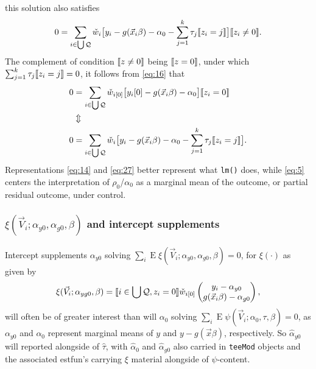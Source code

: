 \documentclass{article}
\newcommand{\EE}{\operatorname{E}}
\DeclarePairedDelimiter{\indicator}{\llbracket}{\rrbracket}
\newcommand{\owt}[1][{[z_{i}]}]{\ensuremath{\check{w}_{i#1}}}
\begin{document}
this solution also satisfies
\begin{equation*}
       0 = \sum_{i \in \bigcup \mathcal{Q}}\owt[]\big[y_{i} - g(\vec{x}_{i}\beta)-
                  \alpha_{0}-\sum_{j=1}^{k}\tau_{j}\indicator{z_{i}=j}\big]\indicator{z_{i}
                  \neq 0}.
\end{equation*}
The complement of condition $\indicator{z\neq 0}$ being
$\indicator{z=0}$, under which
$\sum_{j=1}^{k}\tau_{j}\indicator{z_{i}=j}=0$, it follows from \eqref{eq:16} that
\begin{align*}
         0 &= \sum_{i \in \bigcup \mathcal{Q}}\owt[{[0]}]\big[y_{i}[0] - g(\vec{x}_{i}\beta)-
                  \alpha_{0}\big]\indicator{z_{i}
             =0}\\
           & \Updownarrow \\
         0 &= \sum_{i \in \bigcup \mathcal{Q}}\owt[]\big[y_{i} - g(\vec{x}_{i}\beta)-
                  \alpha_{0} - \sum_{j=1}^{k}\tau_{j}\indicator{z_{i}=j}\big].
\end{align*}
Representations \eqref{eq:14} and \eqref{eq:27} better represent what
\texttt{lm()} does, while \eqref{eq:5} centers the interpretation of $\rho_{0}$/$\alpha_{0}$ as a
marginal mean of the outcome, or partial residual outcome, under control.

\subsubsection{$\xi(\vec{V}_i; \alpha_{y0}, \alpha_{g0}, \beta)$ and intercept supplements}\label{sec:xivecv_i-alph-alph}
Intercept supplements $\alpha_{y0}$ solving $\sum_{i} \EE \xi(\vec{V}_i; \alpha_{y0}, \alpha_{g0}, \beta) =0$, for $\xi(\cdot)$ as given by
\begin{equation}\label{eq:34}
  \xi(\vec{V}_i; \alpha_{yg0},  \beta) =
  \indicator{i \in \bigcup \mathcal{Q}, z_{i}=0}\owt[{[0]}]
  \begin{pmatrix}
    y_{i}-\alpha_{y0}\\
    g(\vec{x}_{i}\beta) - \alpha_{g0}
  \end{pmatrix}
,
\end{equation}
will often be of greater interest than will $\alpha_{0}$ solving $\sum_{i} \EE \psi(\vec{V}_i; \alpha_{0}, \tau, \beta) =0$, as $\alpha_{y0}$ and  $\alpha_{0}$ represent marginal means of $y$ and $y-g(\vec{x}\beta)$, respectively.  So $\hat{\alpha}_{y0}$ will reported alongside of $\hat{\tau}$, with $\hat{\alpha}_{0}$ and $\hat{\alpha}_{g0}$ also carried in \texttt{teeMod} objects and the associated estfun's carrying $\xi$ material alongside of $\psi$-content.
\end{document}
